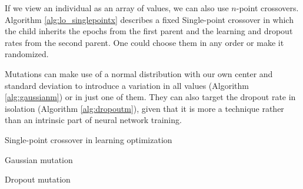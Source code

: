 	\vspace{0.3cm}

	If we view an individual as an array of values, we can also use $n$-point crossovers. Algorithm \ref{alg:lo_singlepointx} describes a fixed Single-point crossover in which the child inherits the epochs from the first parent and the learning and dropout rates from the second parent. One could choose them in any order or make it randomized.

	Mutations can make use of a normal distribution with our own center and standard deviation to introduce a variation in all values (Algorithm \ref{alg:gaussianm}) or in just one of them. They can also target the dropout rate in isolation (Algorithm \ref{alg:dropoutm}), given that it is more a technique rather than an intrinsic part of neural network training.

	\vspace{0.3cm}

	\begin{algorithm}[H]\label{alg:lo_singlepointx}


		\caption{Single-point crossover in learning optimization}

	\end{algorithm}

	\vspace{0.3cm}

	\begin{algorithm}[H]\label{alg:gaussianm}


		\caption{Gaussian mutation}

	\end{algorithm}

	\vspace{0.3cm}

	\begin{algorithm}[H]\label{alg:dropoutm}


		\caption{Dropout mutation}

	\end{algorithm}

	\vspace{0.3cm}
